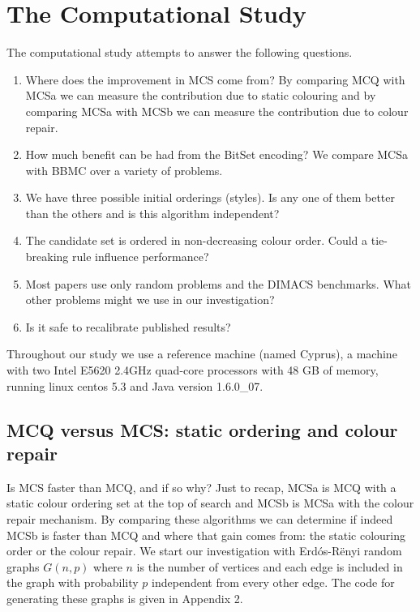 \documentclass{l4proj}
\begin{document}
%
\chapter{The Computational Study}
\vspace{-1.5mm}
The computational study attempts to answer the following questions.
\begin{enumerate}
\item Where does the improvement in MCS come from? By comparing MCQ with MCSa we can
measure the contribution due to static colouring and by comparing MCSa with MCSb 
we can measure the contribution due to colour repair.
\item How much benefit can be had from the BitSet encoding? We compare MCSa with BBMC over a variety of problems.
\item We have three possible initial orderings (styles). Is any one of them better than the others and is this algorithm independent? 
\item The candidate set is ordered in non-decreasing colour order. Could a tie-breaking rule
influence performance?
\item Most papers use only random problems and the DIMACS benchmarks. What other problems might we use in our investigation?
\item Is it safe to recalibrate published results?
\end{enumerate}
Throughout our study we use a reference machine (named Cyprus), a machine with two Intel E5620 2.4GHz quad-core processors with 
48 GB of memory, running linux centos 5.3 and Java version 1.6.0\_07. 

\section{MCQ versus MCS: static ordering and colour repair}
Is MCS faster than MCQ, and if so why? Just to recap, MCSa is MCQ with a static colour ordering set at the top
of search and MCSb is MCSa with the colour repair mechanism. By comparing these algorithms we can determine
if indeed MCSb is faster than MCQ and where that gain comes from: the static colouring order or the colour repair.
We start our investigation with Erd\'{o}s-R\"{e}nyi random graphs $G(n,p)$ where $n$ is the number of vertices and
each edge is included in the graph with probability $p$ independent from every other edge. The code for generating
these graphs is given in Appendix 2. 
\end{document}
